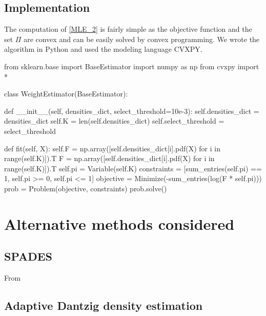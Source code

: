 \subsection{Implementation}
The computation of \cref{MLE_2} is fairly simple as the objective function and the set $\Pi$ are convex and can be easily solved by convex programming. We wrote the algorithm in Python and used the modeling language CVXPY\cite{cvxpy}.\\
\begin{python}
from sklearn.base import BaseEstimator
import numpy as np
from cvxpy import *


class WeightEstimator(BaseEstimator):

    def __init__(self, densities_dict, select_threshold=10e-3):
        self.densities_dict  = densities_dict
        self.K = len(self.densities_dict)
        self.select_threshold = select_threshold

    def fit(self, X):
        self.F = np.array([self.densities_dict[i].pdf(X) for i in range(self.K)]).T
        F = np.array([self.densities_dict[i].pdf(X) for i in range(self.K)]).T
        self.pi = Variable(self.K)
        constraints = [sum_entries(self.pi) == 1, self.pi >= 0, self.pi <= 1]
        objective = Minimize(-sum_entries(log(F * self.pi)))
        prob = Problem(objective, constraints)
        prob.solve()
\end{python}

\section{Alternative methods considered}
\subsection{SPADES}
From \cite{SPADES}
\subsection{Adaptive Dantzig density estimation}

